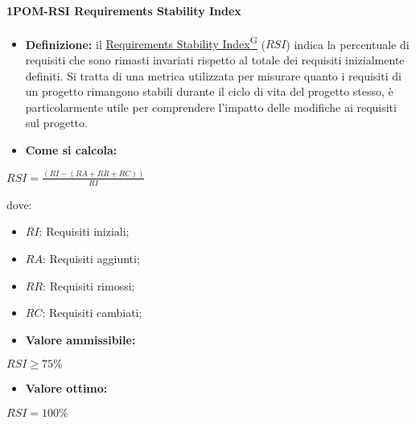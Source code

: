\paragraph*{1POM-RSI Requirements Stability Index}
\begin{itemize}
    \item \textbf{Definizione:} il \href{https://code7crusaders.github.io/docs/PB/documentazione_interna/glossario.html#requirements-stability-index}{Requirements Stability Index\textsuperscript{G}} ($RSI$) indica la percentuale di requisiti che sono rimasti invariati rispetto al totale dei requisiti inizialmente definiti. Si tratta di una metrica utilizzata per misurare quanto i requisiti di un progetto rimangono stabili durante il ciclo di vita del progetto stesso, è particolarmente utile per comprendere l’impatto delle modifiche ai requisiti sul progetto.
    \item \textbf{Come si calcola:}
\end{itemize}
\begin{center}
    $RSI = \frac{(RI-(RA + RR + RC))}{RI}$ 
 \end{center}
 dove:
 \begin{itemize}[label=$\rightarrow$]
     \item $RI$: Requisiti iniziali;
     \item $RA$: Requisiti aggiunti;
     \item $RR$: Requisiti rimossi;
     \item $RC$: Requisiti cambiati;
 \end{itemize}
\begin{itemize}
    \item \textbf{Valore ammissibile:}
\end{itemize}
\begin{center}
    $RSI \geq 75\%$
\end{center}
\begin{itemize}
    \item \textbf{Valore ottimo:}
\end{itemize}
\begin{center}
    $RSI = 100\%$
\end{center}

